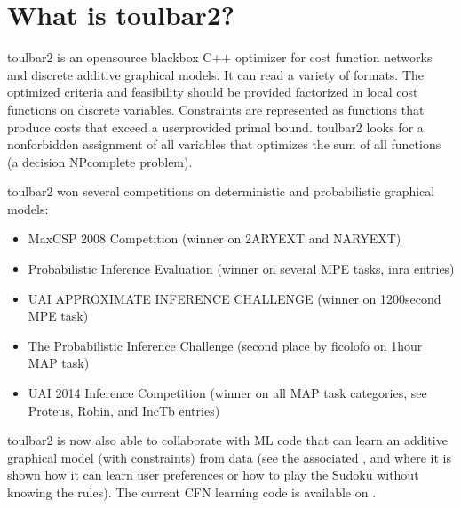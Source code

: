 \documentclass[letterpaper,10pt,openany,oneside,english]{sphinxmanual}
\begin{document}
\section{What is toulbar2?}
\label{\detokenize{_files/README:what-is-toulbar2}}\label{\detokenize{_files/README:readme-1}}
\sphinxAtStartPar
toulbar2 is an open\sphinxhyphen{}source black\sphinxhyphen{}box C++ optimizer for cost function
networks and discrete additive graphical models. It can read a variety
of formats. The optimized criteria and feasibility should be provided
factorized in local cost functions on discrete variables. Constraints
are represented as functions that produce costs that exceed a
user\sphinxhyphen{}provided primal bound. toulbar2 looks for a non\sphinxhyphen{}forbidden assignment
of all variables that optimizes the sum of all functions (a decision
NP\sphinxhyphen{}complete problem).

\sphinxAtStartPar
toulbar2 won several competitions on deterministic and probabilistic
graphical models:
\begin{itemize}
\item {} 
\sphinxAtStartPar
Max\sphinxhyphen{}CSP 2008 Competition  (winner on 2\sphinxhyphen{}ARY\sphinxhyphen{}EXT and N\sphinxhyphen{}ARY\sphinxhyphen{}EXT)

\item {} 
\sphinxAtStartPar
Probabilistic Inference Evaluation  (winner on several MPE tasks, inra entries)

\item {} 
 UAI APPROXIMATE INFERENCE CHALLENGE  (winner on 1200\sphinxhyphen{}second MPE task)

\item {} 
\sphinxAtStartPar
The Probabilistic Inference Challenge  (second place by ficolofo on 1\sphinxhyphen{}hour MAP task)

\item {} 
\sphinxAtStartPar
UAI 2014 Inference Competition  (winner on all MAP task categories, see Proteus, Robin, and IncTb entries)

\end{itemize}

\sphinxAtStartPar
toulbar2 is now also able to collaborate with ML code that can learn
an additive graphical model (with constraints) from data (see the
associated
,
and  where it is
shown how it can learn user preferences or how to play the Sudoku
without knowing the rules). The current CFN learning code is available
on .
\end{document}
